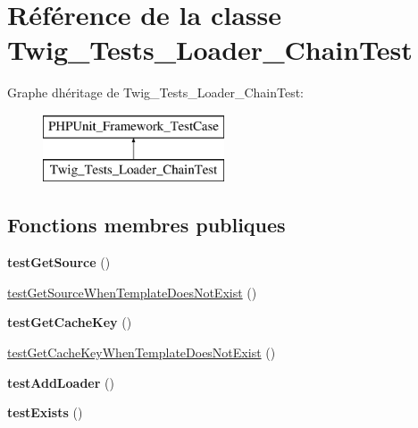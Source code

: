 \hypertarget{class_twig___tests___loader___chain_test}{}\section{Référence de la classe Twig\+\_\+\+Tests\+\_\+\+Loader\+\_\+\+Chain\+Test}
\label{class_twig___tests___loader___chain_test}
Graphe d\textquotesingle{}héritage de Twig\+\_\+\+Tests\+\_\+\+Loader\+\_\+\+Chain\+Test\+:\begin{figure}[H]
\begin{center}
\leavevmode
\includegraphics[height=2.000000cm]{class_twig___tests___loader___chain_test}
\end{center}
\end{figure}
\subsection*{Fonctions membres publiques}
\begin{DoxyCompactItemize}
\item 
{\bfseries test\+Get\+Source} ()\hypertarget{class_twig___tests___loader___chain_test_a3881ac59db6e56947aea2ef1e9d40aef}{}\label{class_twig___tests___loader___chain_test_a3881ac59db6e56947aea2ef1e9d40aef}

\item 
\hyperlink{class_twig___tests___loader___chain_test_a1732f5ce8510e389aff3d42b4286beea}{test\+Get\+Source\+When\+Template\+Does\+Not\+Exist} ()
\item 
{\bfseries test\+Get\+Cache\+Key} ()\hypertarget{class_twig___tests___loader___chain_test_ac0d47f7d43ac83b097c7b95c29a55a41}{}\label{class_twig___tests___loader___chain_test_ac0d47f7d43ac83b097c7b95c29a55a41}

\item 
\hyperlink{class_twig___tests___loader___chain_test_a6f86d1d270770b4f976ba195b1301040}{test\+Get\+Cache\+Key\+When\+Template\+Does\+Not\+Exist} ()
\item 
{\bfseries test\+Add\+Loader} ()\hypertarget{class_twig___tests___loader___chain_test_a5907c491d380a7c6334b13e6312fefed}{}\label{class_twig___tests___loader___chain_test_a5907c491d380a7c6334b13e6312fefed}

\item 
{\bfseries test\+Exists} ()\hypertarget{class_twig___tests___loader___chain_test_a7b93acff6a30e7baddaada61598785c2}{}\label{class_twig___tests___loader___chain_test_a7b93acff6a30e7baddaada61598785c2}

\end{DoxyCompactItemize}



